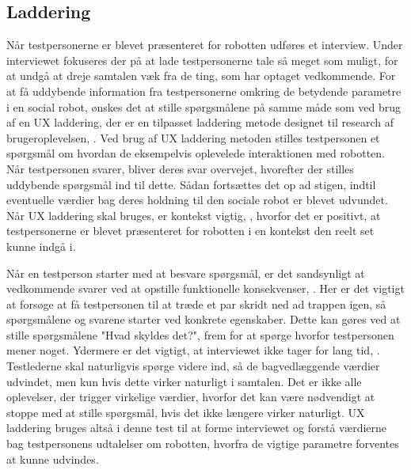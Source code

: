 \subsection{Laddering}
\label{ParametreLaddering}
%
Når testpersonerne er blevet præsenteret for robotten udføres et interview. Under interviewet fokuseres der på at lade testpersonerne tale så meget som muligt, for at undgå at dreje samtalen væk fra de ting, som har optaget vedkommende. For at få uddybende information fra testpersonerne omkring de betydende parametre i en social robot, ønskes det at stille spørgsmålene på samme måde som ved brug af en UX laddering, der er en tilpasset laddering metode designet til research af brugeroplevelsen, \parencite[ss. 3-4]{PDF:LadderingTheUserExperience}. Ved brug af UX laddering metoden stilles testpersonen et spørgsmål om hvordan de eksempelvis oplevelede interaktionen med robotten. Når testpersonen svarer, bliver deres svar overvejet, hvorefter der stilles uddybende spørgsmål ind til dette. Sådan fortsættes det op ad stigen, indtil eventuelle værdier bag deres holdning til den sociale robot er blevet udvundet. Når UX laddering skal bruges, er kontekst vigtig, \parencite[s. 3]{PDF:LadderingTheUserExperience}, hvorfor det er positivt, at testpersonerne er blevet præsenteret for robotten i en kontekst den reelt set kunne indgå i. 

Når en testperson starter med at besvare spørgsmål, er det sandsynligt at vedkommende svarer ved at opstille funktionelle konsekvenser, \parencite[s. 3]{PDF:LadderingTheUserExperience}. Her er det vigtigt at forsøge at få testpersonen til at træde et par skridt ned ad trappen igen, så spørgsmålene og svarene starter ved konkrete egenskaber. Dette kan gøres ved at stille spørgsmålene "Hvad skyldes det?", frem for at spørge hvorfor testpersonen mener noget. Ydermere er det vigtigt, at interviewet ikke tager for lang tid, \parencite[s. 4]{PDF:LadderingTheUserExperience}. Testlederne skal naturligvis spørge videre ind, så de bagvedlæggende værdier udvindet, men kun hvis dette virker naturligt i samtalen. Det er ikke alle oplevelser, der trigger virkelige værdier, hvorfor det kan være nødvendigt at stoppe med at stille spørgsmål, hvis det ikke længere virker naturligt. \blankline
%
UX laddering bruges altså i denne test til at forme interviewet og forstå værdierne bag testpersonens udtalelser om robotten, hvorfra de vigtige parametre forventes at kunne udvindes.

